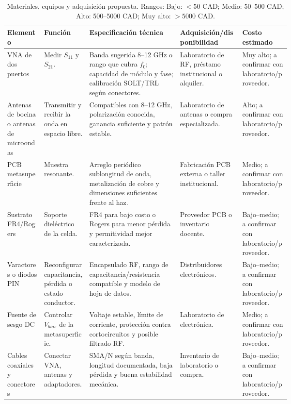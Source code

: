 \documentclass[12pt,a4paper]{article}
\begin{document}
\begin{table}[htbp]
  \centering
  \scriptsize
  \setlength{\tabcolsep}{2.5pt}
  \caption{Materiales, equipos y adquisición propuesta. Rangos: Bajo: \(<50\) CAD; Medio: 50--500 CAD; Alto: 500--5000 CAD; Muy alto: \(>5000\) CAD.}
  \label{tab:materiales}
  \begin{tabularx}{\textwidth}{p{0.13\linewidth}p{0.16\linewidth}Y p{0.22\linewidth}p{0.17\linewidth}}
    \toprule
    Elemento & Función & Especificación técnica & Adquisición/disponibilidad & Costo estimado \\
    \midrule
    VNA de dos puertos & Medir \(S_{11}\) y \(S_{21}\). & Banda sugerida 8--12 GHz o rango que cubra \(f_0\); capacidad de módulo y fase; calibración SOLT/TRL según conectores. & Laboratorio de RF, préstamo institucional o alquiler. & Muy alto; a confirmar con laboratorio/proveedor. \\
    Antenas de bocina o antenas de microondas & Transmitir y recibir la onda en espacio libre. & Compatibles con 8--12 GHz, polarización conocida, ganancia suficiente y patrón estable. & Laboratorio de antenas o compra especializada. & Alto; a confirmar con laboratorio/proveedor. \\
    PCB metasuperficie & Muestra resonante. & Arreglo periódico sublongitud de onda, metalización de cobre y dimensiones suficientes frente al haz. & Fabricación PCB externa o taller institucional. & Medio; a confirmar con laboratorio/proveedor. \\
    Sustrato FR4/Rogers & Soporte dieléctrico de la celda. & FR4 para bajo costo o Rogers para menor pérdida y permitividad mejor caracterizada. & Proveedor PCB o inventario docente. & Bajo--medio; a confirmar con laboratorio/proveedor. \\
    Varactores o diodos PIN & Reconfigurar capacitancia, pérdida o estado conductor. & Encapsulado RF, rango de capacitancia/resistencia compatible y modelo de hoja de datos. & Distribuidores electrónicos. & Bajo--medio; a confirmar con laboratorio/proveedor. \\
    Fuente de sesgo DC & Controlar \(V_{bias}\) de la metasuperficie. & Voltaje estable, límite de corriente, protección contra cortocircuitos y posible filtrado RF. & Laboratorio de electrónica. & Medio; a confirmar con laboratorio/proveedor. \\
    Cables coaxiales y conectores & Conectar VNA, antenas y adaptadores. & SMA/N según banda, longitud documentada, baja pérdida y buena estabilidad mecánica. & Inventario de laboratorio o compra. & Bajo--medio; a confirmar con laboratorio/proveedor. \\

\end{tabularx}
\end{table}
\end{document}
